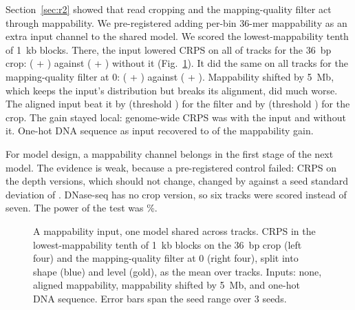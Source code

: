\documentclass[pdflatex,sn-mathphys-num]{sn-jnl}
\newcommand{\lit}[1]{#1}
\begin{document}
Section~\ref{sec:r2} showed that read cropping and the mapping-quality filter act through
mappability. We pre-registered adding per-bin \lit{36}-mer mappability as an extra input channel
to the shared model. We scored the lowest-mappability tenth of \lit{1}~kb blocks. There, the
input lowered CRPS on all \nMapLPass{} of \nMapTracks{} tracks for the \lit{36}~bp crop: \mMapL{}
(\mMapLOS{} + \mMapLSE{}) against \mAlL{} (\mAlLOS{} + \mAlLSE{}) without it
(Fig.~\ref{fig:map}). It did the same on all \nMapQPass{} tracks for the mapping-quality filter at
\lit{0}: \mMapQ{} (\mMapQOS{} + \mMapQSE{}) against \mAlQ{} (\mAlQOS{} + \mAlQSE{}). Mappability
shifted by \lit{5}~Mb, which keeps the input's distribution but breaks its alignment, did much
worse. The aligned input beat it by \sMapQ{} (threshold \sMapQBar{}) for the filter and by
\sMapL{} (threshold \sMapLBar{}) for the crop. The gain stayed local: genome-wide CRPS was
\gMap{} with the input and \gAl{} without it. One-hot DNA sequence as input recovered
\dnaShareLo{} to \dnaShareHi{} of the mappability gain.

For model design, a mappability channel belongs in the first stage of the next model. The
evidence is weak, because a pre-registered control failed: CRPS on the depth versions, which
should not change, changed by \mDepthChg{} against a seed standard deviation of \mDepthSD{}.
DNase-seq has no crop version, so six tracks were scored instead of seven. The power of the
test was \powMap\%.

\begin{figure}[t]
\centering
{}
\caption{A mappability input, one model shared across tracks. CRPS in the lowest-mappability
tenth of \lit{1}~kb blocks on the \lit{36}~bp crop (left four) and the mapping-quality filter
at \lit{0} (right four), split into shape (blue) and level (gold), as the mean over tracks.
Inputs: none, aligned mappability, mappability shifted by \lit{5}~Mb, and one-hot DNA sequence.
Error bars span the seed range over \lit{3} seeds.}\label{fig:map}
\end{figure}
\end{document}
